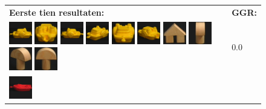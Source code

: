 {\begin{figure}[p]
\vspace{5pt}
\centering
\begin{tabular}{m{11cm} | m{3cm} |}
\textbf{Eerste tien resultaten:} & \textbf{GGR:} \\
\vspace{4pt}
\includegraphics[width=1cm]{coil/beeld-12.eps}
\includegraphics[width=1cm]{coil/beeld-17.eps}
\includegraphics[width=1cm]{coil/beeld-13.eps}
\includegraphics[width=1cm]{coil/beeld-15.eps}
\includegraphics[width=1cm]{coil/beeld-14.eps}
\includegraphics[width=1cm]{coil/beeld-16.eps}
\includegraphics[width=1cm]{coil/beeld-42.eps}
\includegraphics[width=1cm]{coil/beeld-5.eps}
\includegraphics[width=1cm]{coil/beeld-4.eps}
\includegraphics[width=1cm]{coil/beeld-1.eps}
& {\scriptsize 0.0}
\\
\includegraphics[width=1cm]{coil/beeld-18.eps}

\end{tabular}
\end{figure}}
